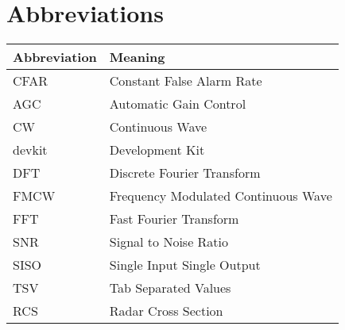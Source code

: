 
\chapter*{Abbreviations}


\begin{center}
  \begin{tabular}{| m{4cm}| m{9cm} | }
    \hline
		\textbf{Abbreviation} & \textbf{Meaning} \\
    \hline
    \hline
		CFAR & Constant False Alarm Rate \\
		AGC & Automatic Gain Control \\
		CW & Continuous Wave \\
		devkit & Development Kit \\
		DFT & Discrete Fourier Transform \\
		FMCW & Frequency Modulated Continuous Wave \\
		FFT & Fast Fourier Transform \\
		SNR & Signal to Noise Ratio \\
		SISO & Single Input Single Output \\
		TSV & Tab Separated Values \\
		RCS & Radar Cross Section \\
    \hline
  \end{tabular}

\end{center}
